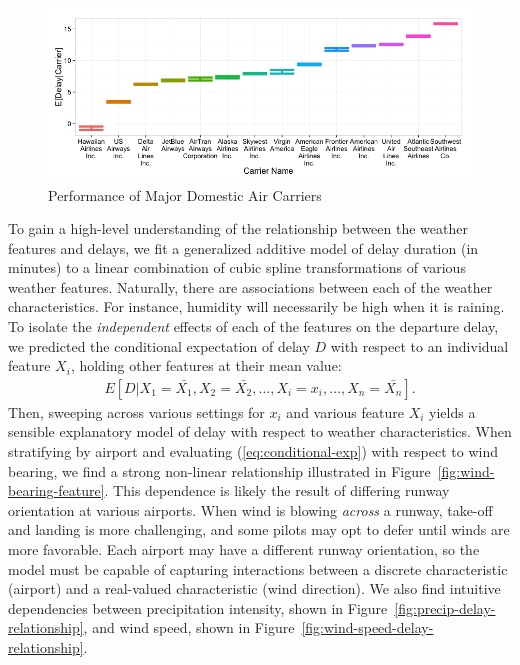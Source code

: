 \documentclass[twocolumn]{article}
\begin{document}
\begin{figure}
    \centering
    \includegraphics[width=\linewidth]{figures/carrier-performance.png}
    \caption{Performance of Major Domestic Air Carriers}
    \label{fig:carrier-performance}
\end{figure}

To gain a high-level understanding of the relationship between the weather features and delays, we fit a generalized additive model \citep{hastie1990generalized} of delay duration (in minutes) to a linear combination of cubic spline transformations of various weather features. Naturally, there are associations between each of the weather characteristics. For instance, humidity will necessarily be high when it is raining. To isolate the \emph{independent} effects of each of the features on the departure delay, we predicted the conditional expectation of delay $D$ with respect to an individual feature $X_i$, holding other features at their mean value:
\begin{align}
    \label{eq:conditional-exp}
    E[D|X_1=\bar{X_1}, X_2=\bar{X_2}, \ldots, X_i = x_i, \ldots, X_n = \bar{X_n}].
\end{align}
Then, sweeping across various settings for $x_i$ and various feature $X_i$ yields a sensible explanatory model of delay with respect to weather characteristics. When stratifying by airport and evaluating (\ref{eq:conditional-exp}) with respect to wind bearing, we find a strong non-linear relationship illustrated in Figure~\ref{fig:wind-bearing-feature}. 
This dependence is likely the result of differing runway orientation at various airports. When wind is blowing \emph{across} a runway, take-off and landing is more challenging, and some pilots may opt to defer until winds are more favorable. Each airport may have a different runway orientation, so the model must be capable of capturing interactions between a discrete characteristic (airport) and a real-valued characteristic (wind direction).
We also find intuitive dependencies between precipitation intensity, shown in Figure~\ref{fig:precip-delay-relationship}, and wind speed, shown in Figure~\ref{fig:wind-speed-delay-relationship}.
\end{document}
